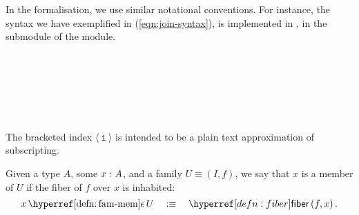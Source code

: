 In the \veragda{} formalisation, we use similar notational conventions. For instance,
the syntax we have exemplified in (\ref{eqn:join-syntax}), is implemented in \veragda{},
in the  submodule of the  module.
\begin{code}%
\>[0]\AgdaSpace{}%
\AgdaSpace{}%
\AgdaSymbol{(}\AgdaSpace{}%
\AgdaSymbol{:}\AgdaSpace{}%
\AgdaSpace{}%
\AgdaSymbol{)}\AgdaSpace{}%
\AgdaSymbol{\{}\AgdaSpace{}%
\AgdaSymbol{:}\AgdaSpace{}%
\AgdaSymbol{\}}\AgdaSpace{}%
\AgdaSymbol{(}\AgdaSpace{}%
\AgdaSymbol{:}\AgdaSpace{}%
\AgdaSpace{}%
\AgdaSpace{}%
\AgdaSpace{}%
\AgdaSpace{}%
\AgdaSymbol{)}\AgdaSpace{}%
\<%
\\
%
\\[\AgdaEmptyExtraSkip]%
\>[0][@{}l@{\AgdaIndent{0}}]%
\>[2]\AgdaSpace{}%
\AgdaSymbol{:}\AgdaSpace{}%
\AgdaSymbol{\{}\AgdaSpace{}%
\AgdaSymbol{:}\AgdaSpace{}%
\AgdaSpace{}%
\AgdaSymbol{\}}\AgdaSpace{}%
\AgdaSpace{}%
\AgdaSymbol{(}\AgdaSpace{}%
\AgdaSpace{}%
\AgdaSymbol{)}\AgdaSpace{}%
\AgdaSpace{}%
\<%
\\
%
\>[2]\AgdaSpace{}%
\AgdaSymbol{\{}\AgdaSpace{}%
\AgdaSymbol{=}\AgdaSpace{}%
\AgdaSymbol{\}}\AgdaSpace{}%
\AgdaSpace{}%
\AgdaSymbol{=}\AgdaSpace{}%
\AgdaSpace{}%
\AgdaSymbol{(}\AgdaSpace{}%
\AgdaOperator{\AgdaInductiveConstructor{,}}\AgdaSpace{}%
\AgdaSymbol{)}\<%
\\
%
\\[\AgdaEmptyExtraSkip]%
%
\>[2]\AgdaSpace{}%
\AgdaSpace{}%
\AgdaSpace{}%
\AgdaSpace{}%
\AgdaSpace{}%
\AgdaSymbol{)}\AgdaSpace{}%
\AgdaSymbol{=}\AgdaSpace{}%
\AgdaSpace{}%
\AgdaSpace{}%
\AgdaSpace{}%
\<%
\end{code}

The bracketed index $\mathtt{⟨~i~⟩}$ is intended to be a plain text approximation of
subscripting.

\begin{defn}\label{defn:fam-mem}
  Given a type $A$, some $x\hspace{0.1mm}:\hspace{0.1mm}A$, and a family $U \equiv (I, f)$, we say
  that $x$ is a member of $U$ if the fiber of $f$ over $x$ is inhabited:
  \begin{equation*}
    \memfam{x}{U} \quad\is\quad \fiber{f}{x}.
  \end{equation*}
\end{defn}

